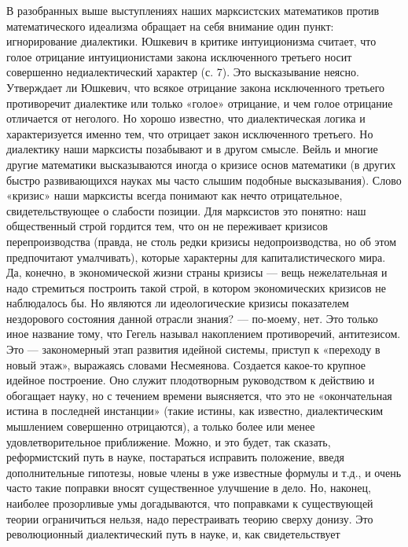 В разобранных выше выступлениях  наших марксистских математиков против
математического  идеализма  обращает  на  себя  внимание  один  пункт:
игнорирование диалектики. Юшкевич в критике интуиционизма считает, что
голое  отрицание интуиционистами  закона  исключенного третьего  носит
совершенно недиалектический характер (с.  7). Это высказывание неясно.
Утверждает  ли  Юшкевич,  что  всякое  отрицание  закона  исключенного
третьего противоречит  диалектике или только «голое»  отрицание, и чем
голое  отрицание  отличается  от  неголого. Но  хорошо  известно,  что
диалектическая логика и характеризуется именно тем, что отрицает закон
исключенного  третьего.  Но  диалектику наши  марксисты  позабывают  и
в  другом  смысле.  Вейль  и многие  другие  математики  высказываются
иногда  о  кризисе основ  математики  (в  других быстро  развивающихся
науках  мы часто  слышим подобные  высказывания). Слово  «кризис» наши
марксисты всегда понимают как нечто отрицательное, свидетельствующее о
слабости позиции.  Для марксистов это понятно:  наш общественный строй
гордится тем, что он  не переживает кризисов перепроизводства (правда,
не  столь  редки кризисы  недопроизводства,  но  об этом  предпочитают
умалчивать),  которые  характерны  для  капиталистического  мира.  Да,
конечно, в  экономической жизни страны кризисы  --- вещь нежелательная
и  надо  стремиться построить  такой  строй,  в котором  экономических
кризисов  не наблюдалось  бы.  Но являются  ли идеологические  кризисы
показателем нездорового состояния данной отрасли знания? --- по-моему,
нет. Это  только иное  название тому,  что Гегель  называл накоплением
противоречий, антитезисом. Это ---  закономерный этап развития идейной
системы,  приступ  к  «переходу   в  новый  этаж»,  выражаясь  словами
Несмеянова. Создается какое-то крупное  идейное построение. Оно служит
плодотворным руководством к действию и  обогащает науку, но с течением
времени  выясняется,  что это  не  «окончательная  истина в  последней
инстанции»  (такие  истины,  как  известно,  диалектическим  мышлением
совершенно отрицаются),  а только  более или  менее удовлетворительное
приближение. Можно,  и это  будет, так  сказать, реформистский  путь в
науке, постараться исправить положение, введя дополнительные гипотезы,
новые  члены в  уже  известные формулы  и т.д.,  и  очень часто  такие
поправки вносят  существенное улучшение в дело.  Но, наконец, наиболее
прозорливые  умы догадываются,  что поправками  к существующей  теории
ограничиться  нельзя, надо  перестраивать  теорию  сверху донизу.  Это
революционный  диалектический путь  в  науке,  и, как  свидетельствует
